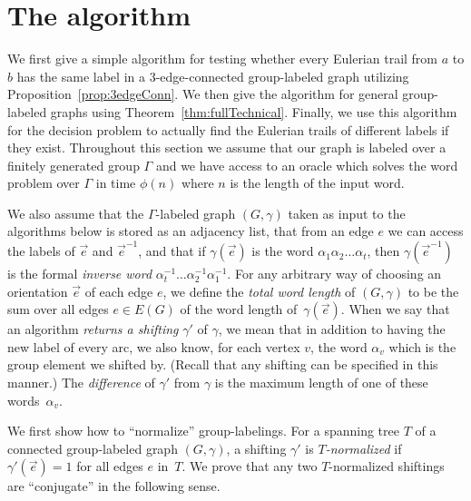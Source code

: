 \documentclass[a4paper, 12pt]{article}
\newcommand{\RMM}[1]{\textcolor{orange}{RM: #1}}
\newcommand{\CM}[1]{\todo[linecolor=red,bordercolor=white,color=Magenta,backgroundcolor=CornflowerBlue!40,textcolor=black,size=\footnotesize]{\textsf{CM: #1}}}
\begin{document}


\section{The algorithm}
\label{sec:algorithm}

We first give a simple algorithm for testing whether every Eulerian trail from $a$ to $b$ has the same label in a 3-edge-connected group-labeled graph utilizing Proposition~\ref{prop:3edgeConn}. We then give the algorithm for general group-labeled graphs using Theorem~\ref{thm:fullTechnical}. Finally, we use this algorithm for the decision problem to actually find the Eulerian trails of different labels if they exist. Throughout this section we assume that our graph is labeled over a finitely generated group $\Gamma$ and we have access to an oracle which solves the {word problem} over $\Gamma$ in time $\phi(n)$ where $n$ is the length of the input word.

We also assume that the $\Gamma$-labeled graph $(G,\gamma)$ taken as input to the algorithms below is stored as an adjacency list, that from an edge $e$ we can access the labels of $\vec{e}$ and $\vec{e}^{-1}$, and that if $\gamma(\vec{e})$ is the word $\alpha_1\alpha_2 \ldots \alpha_t$, then $\gamma(\vec{e}^{-1})$ is the formal \emph{inverse word} $\alpha_t^{-1}\ldots \alpha_2^{-1} \alpha_1^{-1}$. For any arbitrary way of choosing an orientation $\vec{e}$ of each edge $e$, we define the \emph{total word length} of $(G, \gamma)$ to be the sum over all edges $e \in E(G)$ of the word length of~$\gamma(\vec{e})$. When we say that an algorithm \emph{returns a shifting} $\gamma'$ of $\gamma$, we mean that in addition to having the new label of every arc, we also know, for each vertex $v$, the word $\alpha_v$ which is the group element we shifted by. (Recall that any shifting can be specified in this manner.) The \emph{difference} of $\gamma'$ from $\gamma$ is the maximum length of one of these words~$\alpha_v$.


We first show how to ``normalize'' group-labelings. For a spanning tree $T$ of a connected group-labeled graph $(G, \gamma)$, a shifting $\gamma'$ is \emph{$T$-normalized} if $\gamma'(\vec{e}) = 1$ for all edges $e$ in~$T$. We prove that any two $T$-normalized shiftings are ``conjugate'' in the following sense.
\end{document}
